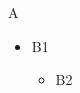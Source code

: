 \documentclass[12pt]{report}
\makeatletter
\newcommand\W[1]{#1 \the\linewidth\space\the\leftmargin\space\the\@totalleftmargin}
\makeatother
\begin{document}
A \the\leftmargini\space\the{}\space\the{}
\begin{itemize}\item \W{B1}\begin{itemize}\item \W{B2}\end{itemize}\end{itemize}
\end{document}
